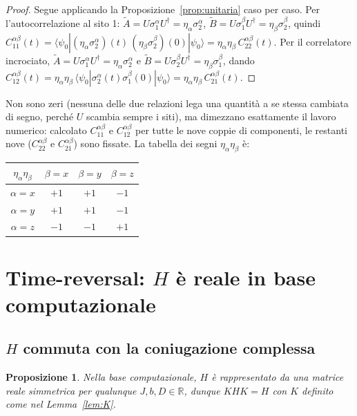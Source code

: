 \documentclass[11pt,a4paper]{article}
\newtheorem{proposizione}{Proposizione}
\begin{document}
\begin{proof}
Segue applicando la Proposizione~\ref{prop:unitaria} caso per caso. Per l'autocorrelazione al
sito 1: $\widetilde A=U\sigma_1^\alpha U^\dagger=\eta_\alpha\sigma_2^\alpha$,
$\widetilde B=U\sigma_1^\beta U^\dagger=\eta_\beta\sigma_2^\beta$, quindi
$C_{11}^{\alpha\beta}(t)=\langle\psi_0|(\eta_\alpha\sigma_2^\alpha)(t)\,(\eta_\beta\sigma_2^\beta)(0)|\psi_0\rangle
=\eta_\alpha\eta_\beta\,C_{22}^{\alpha\beta}(t)$. Per il correlatore incrociato,
$\widetilde A = U\sigma_1^\alpha U^\dagger=\eta_\alpha\sigma_2^\alpha$ e
$\widetilde B=U\sigma_2^\beta U^\dagger=\eta_\beta\sigma_1^\beta$, dando
$C_{12}^{\alpha\beta}(t)=\eta_\alpha\eta_\beta\,\langle\psi_0|\sigma_2^\alpha(t)\sigma_1^\beta(0)|\psi_0\rangle
=\eta_\alpha\eta_\beta\,C_{21}^{\alpha\beta}(t)$.
\end{proof}

\noindent
Non sono zeri (nessuna delle due relazioni lega una quantità a se stessa cambiata di segno,
perché $U$ scambia sempre i siti), ma dimezzano esattamente il lavoro numerico: calcolato
$C_{11}^{\alpha\beta}$ e $C_{12}^{\alpha\beta}$ per tutte le nove coppie di componenti, le
restanti nove ($C_{22}^{\alpha\beta}$ e $C_{21}^{\alpha\beta}$) sono fissate. La tabella dei
segni $\eta_\alpha\eta_\beta$ è:

\begin{center}
\begin{tabular}{c|ccc}
$\eta_\alpha\eta_\beta$ & $\beta=x$ & $\beta=y$ & $\beta=z$ \\\hline
$\alpha=x$ & $+1$ & $+1$ & $-1$ \\
$\alpha=y$ & $+1$ & $+1$ & $-1$ \\
$\alpha=z$ & $-1$ & $-1$ & $+1$
\end{tabular}
\end{center}

\section{Time-reversal: $H$ è reale in base computazionale}
\label{sec:time-reversal}

\subsection{$H$ commuta con la coniugazione complessa}

\begin{proposizione}
\label{prop:H-reale}
Nella base computazionale, $H$ è rappresentato da una matrice reale simmetrica per qualunque
$J,b,D\in\mathbb R$, dunque $KHK=H$ con $K$ definito come nel Lemma~\ref{lem:K}.
\end{proposizione}
\end{document}
